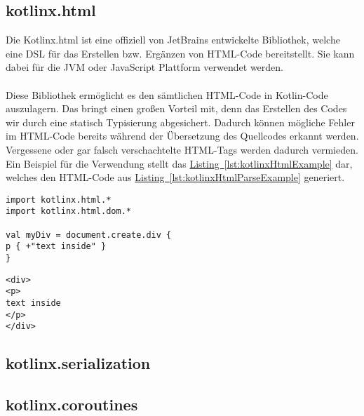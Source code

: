 \subsection{kotlinx.html}
Die Kotlinx.html ist eine offiziell von JetBrains entwickelte Bibliothek, welche eine \gls{DSL} für das Erstellen bzw. Ergänzen von HTML-Code bereitstellt. Sie kann dabei für die \gls{JVM} oder JavaScript Plattform verwendet werden.\\
\\
Diese Bibliothek ermöglicht es den sämtlichen HTML-Code in Kotlin-Code auszulagern. Das bringt einen großen Vorteil mit, denn das Erstellen des Codes wir durch eine statisch Typisierung abgesichert. Dadurch können mögliche Fehler im HTML-Code bereits während der Übersetzung des Quellcodes erkannt werden. Vergessene oder gar falsch verschachtelte HTML-Tags werden dadurch vermieden. Ein Beispiel für die Verwendung stellt das \hyperref[lst:kotlinxHtmlExample]{Listing~\ref{lst:kotlinxHtmlExample}} dar, welches den HTML-Code aus \hyperref[lst:kotlinxHtmlParseExample]{Listing~\ref{lst:kotlinxHtmlParseExample}} generiert.
\begin{lstlisting}[style=lstStyleFramed, caption={[Beispiel: Verwendung der Bibliothek kontlinx.html\protect\footnote{Quelle: \cite{kotlinxHtmlExample}}] Beispiel: Verwendung der Bibliothek kontlinx.html\protect\footnotemark}, label=lst:kotlinxHtmlExample]
import kotlinx.html.*
import kotlinx.html.dom.*

val myDiv = document.create.div {
p { +"text inside" }
}
\end{lstlisting}
\begin{lstlisting}[style=lstStyleFramed, caption={Beispiel: Verwendung der Bibliothek kotlinx.html (Ergebnis)}, label=lst:kotlinxHtmlParseExample]
<div>
<p>
text inside
</p>
</div>
\end{lstlisting}

\subsection{kotlinx.serialization}


\subsection{kotlinx.coroutines}